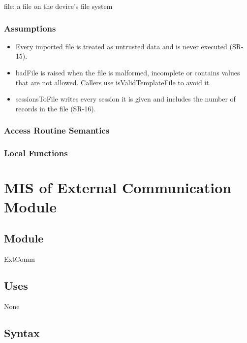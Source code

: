 \documentclass[12pt, titlepage]{article}
\begin{document}
file: a file on the device's file system

\subsubsection{Assumptions}

\begin{itemize}
\item Every imported file is treated as untrusted data and is never executed
  (SR-15).
\item badFile is raised when the file is malformed, incomplete or contains
  values that are not allowed. Callers use isValidTemplateFile to avoid it.
\item sessionsToFile writes every session it is given and includes the number of
  records in the file (SR-16).
\end{itemize}

\subsubsection{Access Routine Semantics}

\subsubsection{Local Functions}

\newpage

\section{MIS of External Communication Module} \label{mis:ExtComm}

\subsection{Module}

ExtComm

\subsection{Uses}

None

\subsection{Syntax}
\end{document}
